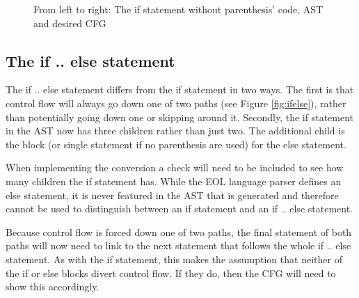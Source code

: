 \begin{figure}
\centering
\begin{minipage}{.3\textwidth}
  \centering
  
\end{minipage}%
\begin{minipage}{.3\textwidth}
  \centering
\end{minipage}
\begin{minipage}{.3\textwidth}
  \centering
\end{minipage}
\caption{From left to right: The if statement without parenthesis' code, AST and desired CFG}
\label{fig:ifnoparen}
\end{figure}

\subsection{The if .. else statement}

The if .. else statement differs from the if statement in two ways. The first is that control flow will always go down one of two paths (see Figure \ref{fig:ifelse}), rather than potentially going down one or skipping around it. Secondly, the if statement in the AST now has three children rather than just two. The additional child is the block (or single statement if no parenthesis are used) for the else statement.

When implementing the conversion a check will need to be included to see how many children the if statement has. While the EOL language parser defines an else statement, it is never featured in the AST that is generated and therefore cannot be used to distinguish between an if statement and an if .. else statement. 

Because control flow is forced down one of two paths, the final statement of both paths will now need to link to the next statement that follows the whole if .. else statement. As with the if statement, this makes the assumption that neither of the if or else blocks divert control flow. If they do, then the CFG will need to show this accordingly.

